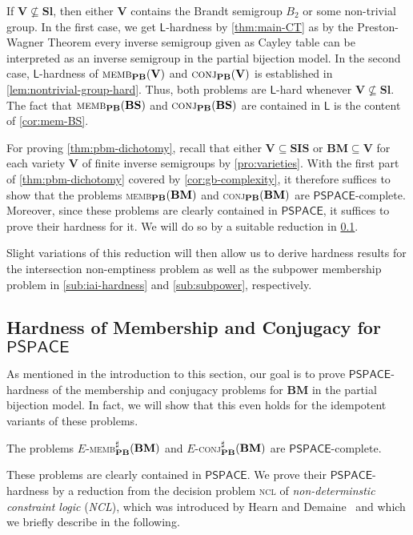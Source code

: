 \documentclass[anonymous,letter,UKenglish,cleveref,autoref,thm-restate]{lipics-v2021}
\newcommand{\sse}{\subseteq}
\newcommand{\LOGSPACE}{\ensuremath{\mathsf{L}}\xspace}
\newcommand{\PSPACE}{\ensuremath{\mathsf{PSPACE}}\xspace}
\newcommand{\vV}{\ensuremath{\mathbf{V}}}
\newcommand{\vSl}{\ensuremath{\mathbf{Sl}}}
\newcommand{\vSI}{\ensuremath{\mathbf{SIS}}}
\newcommand{\vBS}{\ensuremath{\mathbf{BS}}}  \newcommand{\vBM}{\ensuremath{\mathbf{BM}}}
\theoremstyle{plain}
\theoremstyle{plain}
\newcommand{\dMemb}[2][]{\textup{\textsc{memb${}_{\mathbf{#1}}\expandafter\ifx\expandafter\relax\detokenize{#2}\relax\else(#2)\fi$}}}
\newcommand{\dConj}[2][]{\textup{\textsc{conj${}_{\mathbf{#1}}\expandafter\ifx\expandafter\relax\detokenize{#2}\relax\else(#2)\fi$}}}
\newcommand{\dMembS}[2][]{\textup{\textsc{memb${}^{\sharp}_{\mathbf{#1}}\expandafter\ifx\expandafter\relax\detokenize{#2}\relax\else(#2)\fi$}}}
\newcommand{\dConjS}[2][]{\textup{\textsc{conj${}^{\sharp}_{\mathbf{#1}}\expandafter\ifx\expandafter\relax\detokenize{#2}\relax\else(#2)\fi$}}}
\newcommand{\prob}[1]{\textup{\textsc{#1}}\xspace}
\newcommand{\dNCL}{\prob{ncl}}
\newcommand{\dEMembS}[2][]{\ensuremath{E}\textnormal{-}\dMembS[#1]{#2}}
\newcommand{\dEConjS}[2][]{\ensuremath{E}\textnormal{-}\dConjS[#1]{#2}}
\begin{document}
If $\vV \not\sse \vSl$, then either $\vV$ contains the Brandt semigroup $B_2$ or some non-trivial group. 
In the first case, we get \LOGSPACE-hardness by \cref{thm:main-CT} as by the Preston-Wagner Theorem \cite{Preston54,Wagner52} every inverse semigroup given as Cayley table can be interpreted as an inverse semigroup in the partial bijection model.
In the second case, \LOGSPACE-hardness of $\dMemb[PB]{\vV} $ and $\dConj[PB]{\vV}$ is established in \cref{lem:nontrivial-group-hard}.
Thus, both problems are \LOGSPACE-hard whenever $\vV \not\sse \vSl$.
The fact that $\dMemb[PB]{\vBS}$ and $\dConj[PB]{\vBS}$ are contained in \LOGSPACE is the content of \cref{cor:mem-BS}.

For proving \cref{thm:pbm-dichotomy}, recall that either $\vV \sse \vSI$ or $\vBM \sse \vV$ for each variety $\vV$ of finite inverse semigroups by \cref{pro:varieties}.
With the first part of \cref{thm:pbm-dichotomy} covered by \cref{cor:gb-complexity}, it therefore suffices to show that the problems \dMemb[PB]{\vBM} and \dConj[PB]{\vBM} are \PSPACE-complete.
Moreover, since these problems are clearly contained in \PSPACE{}, it suffices to prove their hardness for it.
We will do so by a suitable reduction in \cref{sub:pbm-hardness}.

Slight variations of this reduction will then allow us to derive hardness results for the intersection non-emptiness problem as well as the subpower membership problem in \cref{sub:iai-hardness} and \cref{sub:subpower}, respectively.


\subsection{Hardness of Membership and Conjugacy for \PSPACE}\label{sub:pbm-hardness}

As mentioned in the introduction to this section, our goal is to prove \PSPACE-hardness of the membership and conjugacy problems for $\vBM$ in the partial bijection model.
In fact, we will show that this even holds for the idempotent variants of these problems.

\begin{theorem}\label{thm:pbm-hardness}
  The problems \dEMembS[PB]{\vBM} and \dEConjS[PB]{\vBM} are \PSPACE-complete.
\end{theorem}



These problems are clearly contained in \PSPACE{}.
We prove their \PSPACE-hardness by a reduction from the decision problem \dNCL of \emph{non-determinstic constraint logic} (\emph{NCL}), which was introduced by Hearn and Demaine~\cite{HearnD05} and which we briefly describe in the following.
\end{document}
